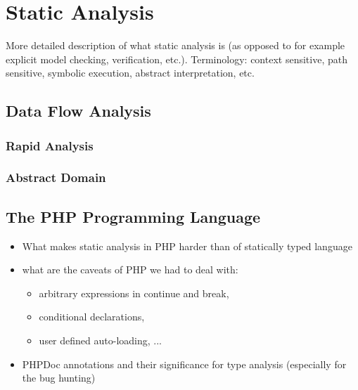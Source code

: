 \chapter{Static Analysis}

    More detailed description of what static analysis is 
    (as opposed to for example explicit model checking, 
    verification, etc.). Terminology: context sensitive, 
    path sensitive, symbolic execution, abstract interpretation, etc.
    
        
    \section{Data Flow Analysis}
        \subsection{Rapid Analysis}
        \subsection{Abstract Domain}

    \section{The PHP Programming Language}
    \begin{itemize}
        \item[] What makes static analysis in PHP harder than of statically typed language
        \item[] what are the caveats of PHP we had to deal with:
            \begin{itemize}
                \item[] arbitrary expressions in continue and break,
                \item[] conditional declarations,
                \item[] user defined auto-loading, ...
            \end{itemize}
        \item[] PHPDoc annotations and their significance for type analysis (especially for the bug hunting)        
    \end{itemize}